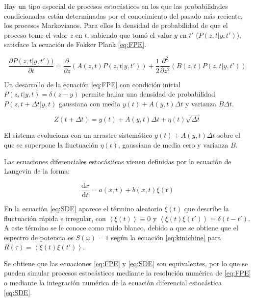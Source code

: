 Hay un tipo especial de procesos estocásticos en los que las probabilidades condicionadas están determinadas por el conocimiento del pasado más reciente, los procesos Markovianos. Para ellos la densidad de probabilidad de que el proceso tome el valor $z$ en $t$, sabiendo que tomó el valor $y$ en $t'$ ($P(z, t| y, t')$), satisface la ecuaci\'on de Fokker Plank \ref{eq:FPE}.

	\begin{equation}
		\frac{\partial P(z, t|y, t'))}{\partial t} = \frac{\partial }{\partial z}\left(A(z, t)P(z, t|y, t') \right ) + \frac{1}{2} \frac{\partial^2 }{\partial z^2}\left(B(z, t)P(z, t|y, t') \right )	
		\label{eq:FPE}
	\end{equation}

Un desarrollo de la ecuaci\'on \ref{eq:FPE} con condición inicial $P(z, t|y, t) = \delta(z-y)$ permite hallar una densidad de probabilidad $P(z, t+\Delta t | y, t)$ gaussiana con media $y(t) + A(y, t)\Delta t$ y varianza $B\Delta t$.

	\begin{equation}
		Z(t+\Delta t) = y(t) + A(y, t)\Delta t + \eta(t) \sqrt{\Delta t}
	\end{equation}

El sistema evoluciona con un arrastre sistem\'atico $y(t) + A(y, t)\Delta t$ sobre el que se superpone la fluctuaci\'on $\eta(t)$, gaussiana de media cero y varianza $B$.

Las ecuaciones diferenciales estoc\'asticas vienen definidas por la ecuaci\'on de Langevin de la forma:

	\begin{equation}
		\frac{\mathrm{d} x}{\mathrm{d} t} = a(x, t) + b(x, t) \xi(t)
		\label{eq:SDE}
	\end{equation}

En la ecuaci\'on \ref{eq:SDE} aparece el t\'ermino aleatorio $\xi(t)$ que describe la fluctuaci\'on r\'apida e irregular, con $\left \langle \xi(t) \right \rangle \equiv 0$ y $\left \langle \xi(t)\xi(t') \right \rangle = \delta(t-t')$. A este t\'ermino se le conoce como ruido blanco, debido a que se obtiene que el espectro de potencia es $S(\omega) = 1$ seg\'un la ecuaci\'on \ref{eq:kintchine} para $R(\tau) = \left \langle \xi(t)\xi(t') \right \rangle$.

Se obtiene que las ecuaciones \ref{eq:FPE} y \ref{eq:SDE} son equivalentes, por lo que se pueden simular procesos estoc\'asticos mediante la resoluci\'on num\'erica de \ref{eq:FPE} o mediante la integraci\'on num\'erica de la ecuaci\'on diferencial estoc\'astica \ref{eq:SDE}. 


